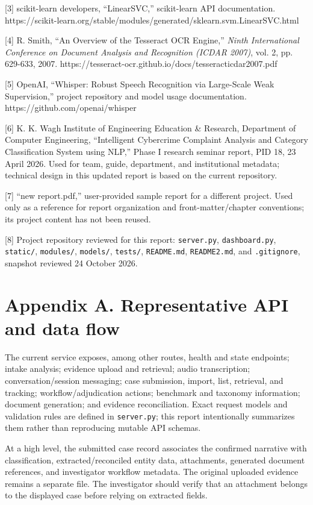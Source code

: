 \documentclass[12pt,a4paper,oneside]{report}
\begin{document}
[3] scikit-learn developers, ``LinearSVC,'' scikit-learn API documentation. https://scikit-learn.org/stable/modules/generated/sklearn.svm.LinearSVC.html

[4] R. Smith, ``An Overview of the Tesseract OCR Engine,'' \emph{Ninth International Conference on Document Analysis and Recognition (ICDAR 2007)}, vol. 2, pp. 629-633, 2007. https://tesseract-ocr.github.io/docs/tesseracticdar2007.pdf

[5] OpenAI, ``Whisper: Robust Speech Recognition via Large-Scale Weak Supervision,'' project repository and model usage documentation. https://github.com/openai/whisper

[6] K. K. Wagh Institute of Engineering Education \& Research, Department of Computer Engineering, ``Intelligent Cybercrime Complaint Analysis and Category Classification System using NLP,'' Phase I research seminar report, PID 18, 23 April 2026. Used for team, guide, department, and institutional metadata; technical design in this updated report is based on the current repository.

[7] ``new report.pdf,'' user-provided sample report for a different project. Used only as a reference for report organization and front-matter/chapter conventions; its project content has not been reused.

[8] Project repository reviewed for this report: \texttt{server.py}, \texttt{dashboard.py}, \texttt{static/}, \texttt{modules/}, \texttt{models/}, \texttt{tests/}, \texttt{README.md}, \texttt{README2.md}, and \texttt{.gitignore}, snapshot reviewed 24 October 2026.

\clearpage\chapter{Appendix A. Representative API and data flow}
The current service exposes, among other routes, health and state endpoints; intake analysis; evidence upload and retrieval; audio transcription; conversation/session messaging; case submission, import, list, retrieval, and tracking; workflow/adjudication actions; benchmark and taxonomy information; document generation; and evidence reconciliation. Exact request models and validation rules are defined in \texttt{server.py}; this report intentionally summarizes them rather than reproducing mutable API schemas.

At a high level, the submitted case record associates the confirmed narrative with classification, extracted/reconciled entity data, attachments, generated document references, and investigator workflow metadata. The original uploaded evidence remains a separate file. The investigator should verify that an attachment belongs to the displayed case before relying on extracted fields.
\end{document}
